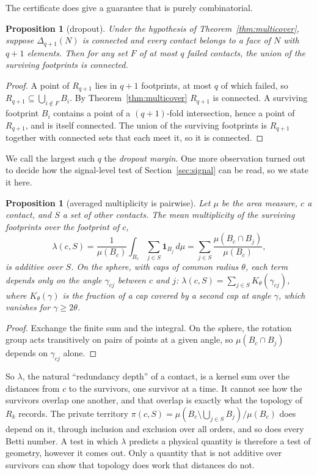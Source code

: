 \documentclass[11pt]{amsart}
\newtheorem{proposition}[theorem]{Proposition}
\theoremstyle{definition}
\theoremstyle{remark}
\begin{document}
The certificate does give a guarantee that is purely combinatorial.

\begin{proposition}[dropout]\label{prop:dropout}
Under the hypothesis of Theorem~\ref{thm:multicover}, suppose
$\Delta_{q+1}(N)$ is connected and every contact belongs to a face of $N$
with $q+1$ elements. Then for any set $F$ of at most $q$ failed contacts, the
union of the surviving footprints is connected.
\end{proposition}

\begin{proof}
A point of $R_{q+1}$ lies in $q+1$ footprints, at most $q$ of which failed,
so $R_{q+1}\subseteq\bigcup_{i\notin F}B_i$. By Theorem~\ref{thm:multicover}
$R_{q+1}$ is connected. A surviving footprint $B_i$ contains a point of a
$(q+1)$-fold intersection, hence a point of $R_{q+1}$, and is itself
connected. The union of the surviving footprints is $R_{q+1}$ together with
connected sets that each meet it, so it is connected.
\end{proof}

We call the largest such $q$ the \emph{dropout margin}. One more
observation turned out to decide how the signal-level test of
Section~\ref{sec:signal} can be read, so we state it here.

\begin{proposition}[averaged multiplicity is pairwise]\label{prop:pairwise}
Let $\mu$ be the area measure, $c$ a contact, and $S$ a set of other
contacts. The mean multiplicity of the surviving footprints over the
footprint of $c$,
\[
\lambda(c,S)=\frac{1}{\mu(B_c)}\int_{B_c}\sum_{j\in S}\mathbf 1_{B_j}\,d\mu
=\sum_{j\in S}\frac{\mu(B_c\cap B_j)}{\mu(B_c)},
\]
is additive over $S$. On the sphere, with caps of common radius $\theta$, each
term depends only on the angle $\gamma_{cj}$ between $c$ and $j$:
$\lambda(c,S)=\sum_{j\in S}K_\theta(\gamma_{cj})$, where $K_\theta(\gamma)$
is the fraction of a cap covered by a second cap at angle $\gamma$, which
vanishes for $\gamma\ge2\theta$.
\end{proposition}

\begin{proof}
Exchange the finite sum and the integral. On the sphere, the rotation group
acts transitively on pairs of points at a given angle, so
$\mu(B_c\cap B_j)$ depends on $\gamma_{cj}$ alone.
\end{proof}

So $\lambda$, the natural ``redundancy depth'' of a contact, is a kernel sum
over the distances from $c$ to the survivors, one survivor at a time. It
cannot see how the survivors overlap one another, and that overlap is exactly
what the topology of $R_k$ records. The private territory
$\pi(c,S)=\mu(B_c\setminus\bigcup_{j\in S}B_j)/\mu(B_c)$ does depend on it,
through inclusion and exclusion over all orders, and so does every Betti
number. A test in which $\lambda$ predicts a physical quantity is therefore a
test of geometry, however it comes out. Only a quantity that is not additive
over survivors can show that topology does work that distances do not.
\end{document}
